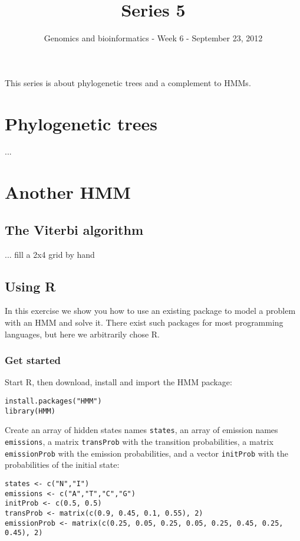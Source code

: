 \documentclass[a4paper,11pt]{article}
\title{Series 5}
\date{}
\author{Genomics and bioinformatics - Week 6 - September 23, 2012}
\begin{document}
\maketitle

This series is about phylogenetic trees and a complement to HMMs.

\section{Phylogenetic trees}

...

\section{Another HMM}

\subsection{The Viterbi algorithm}

... fill a 2x4 grid by hand

\newpage

\subsection{Using R}

In this exercise we show you how to use an existing package to model a problem with an HMM and solve it. There exist such packages for most programming languages, but here we arbitrarily chose R.

\subsubsection{Get started}

Start R, then download, install and import the HMM package:

\begin{verbatim}
install.packages("HMM")
library(HMM)
\end{verbatim}

Create an array of hidden states names \texttt{states}, an array of emission names \texttt{emissions}, a matrix \texttt{transProb} with the transition probabilities, a matrix \texttt{emissionProb} 
with the emission probabilities, and a vector \texttt{initProb} with the probabilities of the initial state:

\begin{verbatim}
states <- c("N","I")
emissions <- c("A","T","C","G")
initProb <- c(0.5, 0.5)
transProb <- matrix(c(0.9, 0.45, 0.1, 0.55), 2)
emissionProb <- matrix(c(0.25, 0.05, 0.25, 0.05, 0.25, 0.45, 0.25, 0.45), 2)
\end{verbatim}
\end{document}
